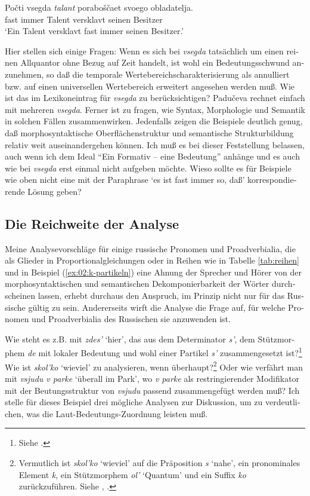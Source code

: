 \documentclass[output=paper, colorlinks, citecolor=brown, booklanguage=german]{langscibook}
\begin{document}
\begin{otherlanguage}{german}
\ea
    \gll Počti vsegda \textit{talant} poraboščaet svoego obladatelja.\\
    fast immer Talent versklavt seinen Besitzer\\
    \glt ‘Ein Talent versklavt fast immer seinen Besitzer.’
\z 

\noindent Hier stellen sich einige Fragen: Wenn es sich bei \textit{vsegda} tatsächlich um einen reinen Allquantor ohne Bezug auf Zeit handelt, ist wohl ein Bedeutungsschwund anzunehmen, so daß die temporale Wertebereichscharakterisierung als annulliert bzw. auf einen universellen Wertebereich erweitert angesehen werden muß. Wie ist das im Lexikoneintrag für \textit{vsegda} zu berücksichtigen? Padučeva rechnet einfach mit mehreren \textit{vsegda}. Ferner ist zu fragen, wie Syntax, Morphologie und Semantik in solchen Fällen zusammenwirken. Jedenfalls zeigen die Beispiele deutlich genug, daß morphosyntaktische Oberflächenstruktur und semantische Strukturbildung relativ weit auseinandergehen können. Ich muß es bei dieser Feststellung belassen, auch wenn ich dem Ideal ``Ein Formativ -- eine Bedeutung'' anhänge und es auch wie bei \textit{vsegda} erst einmal nicht aufgeben möchte. Wieso sollte es für Beispiele wie oben nicht eine mit der Paraphrase `es ist fast immer so, daß' korrespondierende Lösung geben?

\subsection{Die Reichweite der Analyse}\label{sec:zi02:reichweite}

Meine Analysevorschläge für einige russische Pronomen und Proadverbialia, die als Glieder in Proportionalgleichungen oder in Reihen wie in Tabelle \ref{tab:reihen} und in Beispiel (\ref{ex:02:k-partikeln}) eine Ahnung der Sprecher und Hörer von der morphosyntaktischen und semantischen De\-kom\-po\-nier\-bar\-keit der Wörter durchscheinen lassen, erhebt durchaus den An\-spruch, im Prinzip nicht nur für das Russische gültig zu sein. Andererseits wirft die Analyse die Frage auf, für welche Pronomen und Proadverbialia des Rus\-si\-schen sie anzuwenden ist.

Wie steht es z.B. mit \textit{zdes'} `hier', das aus dem Determinator \textit{s'}, dem Stützmorphem \textit{de} mit lokaler Bedeutung und wohl einer Partikel \textit{s'} zusammengesetzt ist?\footnote{Siehe \citet[II 89f.]{Vasmer1964}.} Wie ist \textit{skol'ko} `wieviel' zu analysieren, wenn überhaupt?\footnote{Vermutlich ist \textit{skol'ko} `wieviel' auf die Präposition \textit{s} `nahe', ein pronominales Element \textit{k}, ein Stützmorphem \textit{ol'} `Quantum' und ein Suffix \textit{ko} zurückzuführen. Siehe \citet[335]{Preobrazenskij1958}, \citet[III 647]{Vasmer1964}.} Oder wie verfährt man mit \textit{vsjudu v parke} `überall im Park', wo \textit{v parke} als restringierender Modifikator mit der Beutungsstruktur von \textit{vsjudu} passend zusammengefügt werden muß? Ich stelle für dieses Beispiel drei mögliche Analysen zur Diskussion, um zu verdeutlichen, was die Laut-Bedeutungs-Zuordnung leisten muß.


\end{otherlanguage}
\end{document}
